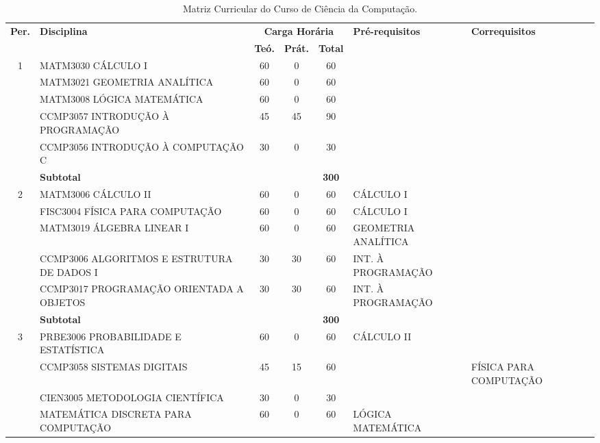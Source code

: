\documentclass[
	12pt,				%
	openright,			%
  oneside,     %
	a4paper,			%
	chapter=TITLE,		%
	english,			%
	french,				%
	spanish,			%
	brazil				%
	]{abntex2}
\begin{document}
\begin{center}
    \begin{tiny}
      \begin{longtable}{cp{4.5cm}cccp{2.8cm}p{2.8cm}}
        \caption{\label{quadro:matriz-curricular-do-curso}Matriz Curricular do Curso de  Ciência da Computação.}\\
      \toprule
      \textbf{Per.} & \textbf{Disciplina} & \multicolumn{3}{c}{\textbf{Carga Horária}} & \textbf{Pré-requisitos} & \textbf{Correquisitos}\\
      & & \textbf{Teó.} & \textbf{Prát.} & \textbf{Total} & & \\
      \midrule
      1 
        & MATM3030 CÁLCULO I & 60 & 0 & 60 & & \\ \cline{2-7}
        & MATM3021 GEOMETRIA ANALÍTICA & 60 & 0 & 60 & & \\ \cline{2-7}
        & MATM3008 LÓGICA MATEMÁTICA & 60 & 0 & 60  & &\\ \cline{2-7}
        & CCMP3057 INTRODUÇÃO À PROGRAMAÇÃO & 45 & 45 & 90  & &\\ \cline{2-7}
        & CCMP3056 INTRODUÇÃO À COMPUTAÇÃO C & 30 & 0 & 30  & &\\ \midrule
        & \multicolumn{3}{l}{\textbf{Subtotal}} & \textbf{300} & & \\ \midrule
      2 
        & MATM3006 CÁLCULO II & 60 & 0 & 60 & CÁLCULO I & \\ \cline{2-7}   
        & FISC3004 FÍSICA PARA COMPUTAÇÃO & 60 & 0 & 60 & CÁLCULO I & \\ \cline{2-7}
        & MATM3019 ÁLGEBRA LINEAR I & 60 & 0 & 60 & GEOMETRIA ANALÍTICA & \\ \cline{2-7}
        & CCMP3006 ALGORITMOS E ESTRUTURA DE DADOS I & 30 & 30 & 60 & INT. À PROGRAMAÇÃO & \\  \cline{2-7}
        & CCMP3017 PROGRAMAÇÃO ORIENTADA A OBJETOS & 30 & 30 & 60 & INT. À PROGRAMAÇÃO & \\ \midrule
        & \multicolumn{3}{l}{\textbf{Subtotal}} & \textbf{300} & & \\ \midrule
    3 
        & PRBE3006 PROBABILIDADE E ESTATÍSTICA & 60 & 0 & 60 & CÁLCULO II & \\ \cline{2-7}
        & CCMP3058 SISTEMAS DIGITAIS & 45 & 15 & 60 & & FÍSICA PARA COMPUTAÇÃO \\ \cline{2-7}
        & CIEN3005 METODOLOGIA CIENTÍFICA & 30 & 0 & 30 & & \\ \cline{2-7}
        & MATEMÁTICA DISCRETA PARA COMPUTAÇÃO & 60 & 0 & 60 & LÓGICA MATEMÁTICA & \\ \cline{2-7}

\end{longtable}
\end{tiny}
\end{center}
\end{document}

